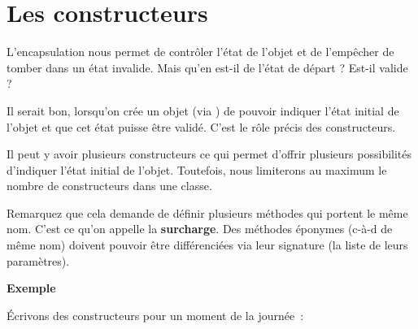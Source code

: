 \section{Les constructeurs}

L'encapsulation nous permet de contrôler
l'état de l'objet et de
l'empêcher de tomber dans un état invalide. Mais
qu'en est-il de l'état de départ ?
Est-il valide ?

Il serait bon, lorsqu'on crée un objet (via
) de pouvoir indiquer l'état
initial de l'objet et que cet état puisse être validé.
C'est le rôle précis des constructeurs.

{\sffamily\bfseries{}}

Il peut y avoir plusieurs constructeurs ce qui permet
d'offrir plusieurs possibilités d'indiquer l'état initial de
l'objet. Toutefois, nous limiterons au maximum le nombre 
de constructeurs dans une classe.

Remarquez que cela demande de définir plusieurs méthodes 
qui portent le même nom. C'est ce qu'on appelle la
\textbf{surcharge}. Des méthodes éponymes (c-à-d de même nom) doivent
pouvoir être différenciées via leur signature (la liste de leurs
paramètres).

{\bfseries
Exemple}

Écrivons des constructeurs pour un moment de la journée~:


